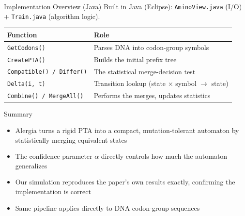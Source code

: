 \documentclass[aspectratio=169]{beamer}
\begin{document}
\begin{frame}{Implementation Overview (Java)}
  Built in Java (Eclipse): \texttt{AminoView.java} (I/O) +
  \texttt{Train.java} (algorithm logic).
  \vspace{0.2cm}
  \small
  \begin{tabular}{ll}
    \toprule
    \textbf{Function} & \textbf{Role} \\
    \midrule
    \texttt{GetCodons()} & Parses DNA into codon-group symbols \\
    \texttt{CreatePTA()} & Builds the initial prefix tree \\
    \texttt{Compatible() / Differ()} & The statistical merge-decision test \\
    \texttt{Delta(i, t)} & Transition lookup (state $\times$ symbol $\to$ state) \\
    \texttt{Combine() / MergeAll()} & Performs the merges, updates statistics \\
    \bottomrule
  \end{tabular}
\end{frame}

\begin{frame}{Summary}
  \begin{itemize}
    \item Alergia turns a rigid PTA into a compact, mutation-tolerant
          automaton by statistically merging equivalent states
    \item The confidence parameter $\alpha$ directly controls how much the
          automaton generalizes
    \item Our simulation reproduces the paper's own results exactly,
          confirming the implementation is correct
    \item Same pipeline applies directly to DNA codon-group sequences
  \end{itemize}
\end{frame}
\end{document}
